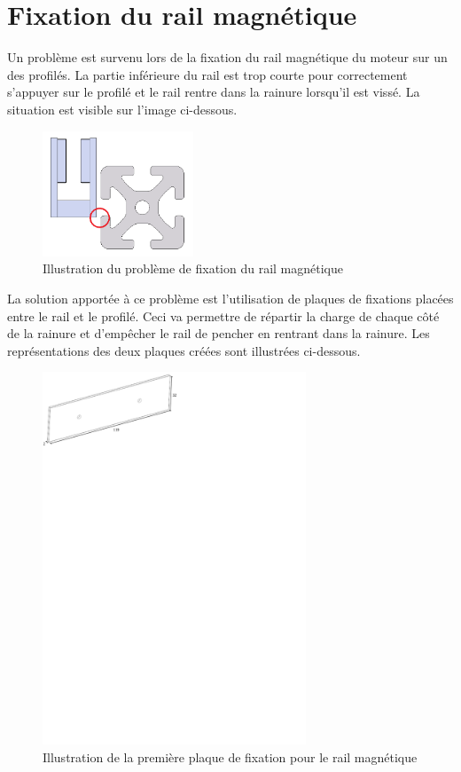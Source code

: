 \section{Fixation du rail magnétique}\label{sec:FixRailMag}
Un problème est survenu lors de la fixation du rail magnétique du moteur sur un des profilés. La partie inférieure du rail est trop courte
pour correctement s'appuyer sur le profilé et le rail rentre dans la rainure lorsqu'il est vissé. La situation est visible sur l'image ci-dessous.

\begin{figure}[H]
    \centering
    \includegraphics[width = 0.4\textwidth]{assets/figures/FixationRailMagProb.png}
    \caption{Illustration du problème de fixation du rail magnétique}
    \label{fig:FixRailMagProb}
\end{figure}

La solution apportée à ce problème est l'utilisation de plaques de fixations placées entre le rail et le profilé. Ceci va permettre de répartir
la charge de chaque côté de la rainure et d'empêcher le rail de pencher en rentrant dans la rainure. Les représentations des deux plaques créées
sont illustrées ci-dessous.

\begin{figure}[H]
    \centering
    \includegraphics[width = 0.7\textwidth]{assets/figures/PlaqueFixation1.svg}
    \caption{Illustration de la première plaque de fixation pour le rail magnétique}
    \label{fig:PlaqueFix1}
\end{figure}

